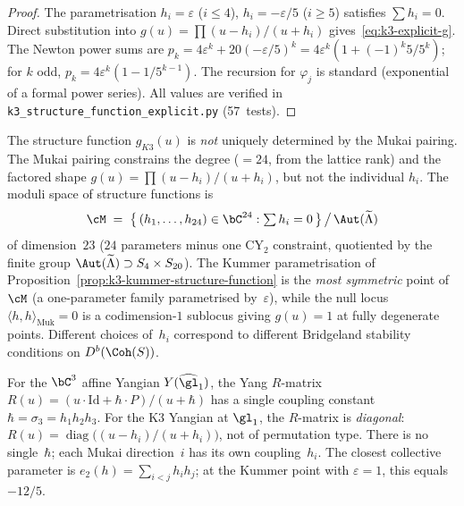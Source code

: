 \begin{proof}
The parametrisation $h_i = \varepsilon$ ($i \leq 4$),
$h_i = -\varepsilon/5$ ($i \geq 5$) satisfies $\sum h_i = 0$.
Direct substitution into $g(u) = \prod(u - h_i)/(u + h_i)$
gives~\eqref{eq:k3-explicit-g}.  The Newton power sums are
$p_k = 4\varepsilon^k + 20(-\varepsilon/5)^k
= 4\varepsilon^k(1 + (-1)^k 5/5^k)$; for $k$ odd,
$p_k = 4\varepsilon^k(1 - 1/5^{k-1})$.
The recursion for $\varphi_j$ is standard
(exponential of a formal power series).
All values are verified in
\texttt{k3\_structure\_function\_explicit.py} (57~tests).
\end{proof}

\begin{remark}
\label{rem:k3-structure-function-moduli}
The structure function $g_{K3}(u)$ is \emph{not} uniquely determined by
the Mukai pairing.  The Mukai pairing constrains the degree ($= 24$,
from the lattice rank) and the factored shape
$g(u) = \prod(u - h_i)/(u + h_i)$, but not the individual $h_i$.
The moduli space of structure functions is
\[
  \cM \;=\;
  \bigl\{\, (h_1, \ldots, h_{24}) \in \bC^{24}
  : \textstyle\sum h_i = 0 \,\bigr\}
  \,\big/\, \Aut(\widetilde\Lambda)
\]
of dimension~$23$ ($24$ parameters minus one CY$_2$ constraint,
quotiented by the finite group $\Aut(\widetilde\Lambda) \supset
S_4 \times S_{20}$).  The Kummer
parametrisation of Proposition~\ref{prop:k3-kummer-structure-function}
is the \emph{most symmetric} point of~$\cM$ (a one-parameter
family parametrised by~$\varepsilon$), while the null locus
$\langle h, h \rangle_{\mathrm{Muk}} = 0$ is a codimension-$1$
sublocus giving $g(u) = 1$ at fully degenerate points.
Different choices of~$h_i$ correspond to different Bridgeland
stability conditions on $D^b(\Coh(S))$.
\end{remark}

\begin{remark}
\label{rem:k3-no-single-hbar}
For the $\bC^3$ affine Yangian $Y(\widehat{\gl}_1)$, the Yang
$R$-matrix $R(u) = (u \cdot \mathrm{Id} + \hbar \cdot P)/(u + \hbar)$
has a single coupling constant $\hbar = \sigma_3 = h_1 h_2 h_3$.
For the K3 Yangian at $\gl_1$, the $R$-matrix is
\emph{diagonal}:
$R(u) = \operatorname{diag}\bigl((u-h_i)/(u+h_i)\bigr)$,
not of permutation type.  There is no single~$\hbar$; each
Mukai direction~$i$ has its own coupling~$h_i$.  The closest
collective parameter is $e_2(h) = \sum_{i < j} h_i h_j$;
at the Kummer point with $\varepsilon = 1$, this equals $-12/5$.
\end{remark}

